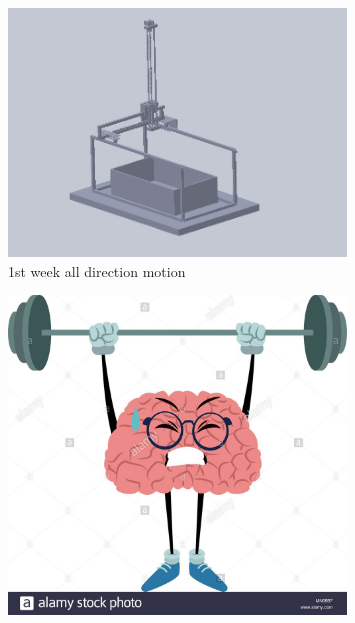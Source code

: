 \documentclass[12pt, a4paper]{beamer}
\begin{document}
	\begin{frame}
		\begin{figure}
		\begin{center}
		\includegraphics[width=0.8\textwidth]{1stweekdesign.jpg}
		\caption{1st week all direction motion}
		\end{center}
		\end{figure}
	\end{frame}

	\begin{frame}
		\begin{figure}
		\begin{center}
		\includegraphics[width=0.8\textwidth]{heavy.jpg}
		\end{center}
		\end{figure}
	\end{frame}
\end{document}
